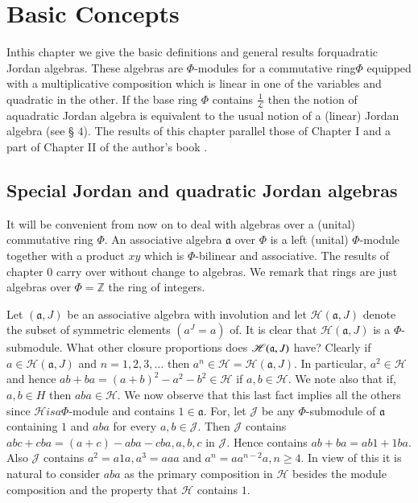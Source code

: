 \chapter{Basic Concepts}\label{c1}

In\pageoriginale this chapter we give the basic definitions and
general results for\break  quadratic Jordan algebras. These algebras are
$\Phi$-modules for a commutative ring$\Phi$ equipped with a
multiplicative composition which is linear in one of the variables and
quadratic in the other. If the base ring $\Phi$ contains
$\frac{1}{\mathscr{L}}$ then the notion of  aquadratic Jordan algebra
is equivalent to the usual notion of a (linear) Jordan algebra (see \S
$4$). The results of this chapter parallel those of Chapter I and a
part of Chapter II of the author's book \cite{JacobsonMcCrimmon1}. 

\section{Special Jordan and quadratic Jordan algebras}\label{c1:sec1}

It will be convenient from now on to deal with algebras over a
(unital) commutative ring $\Phi$. An associative algebra
$\mathfrak{a}$ over $\Phi$ is a left (unital) $\Phi$-module together
with a product $xy$ which is $\Phi$-bilinear and associative. The
results of chapter $0$ carry over without change to algebras. We
remark that rings are just algebras over $\Phi=\mathbb{Z}$ the ring of
integers. 

Let $(\mathfrak{a}, J)$ be an associative algebra with involution and
let $\mathscr{H}(\mathfrak{a}, J)$ denote the subset of symmetric
elements $(a^{J}=a)$ of. It is clear that
$\mathscr{H}(\mathfrak{a},J)$ is a $\Phi$-submodule. What other
closure proportions does $\mathscr{H}(\mathfrak{a},\break J)$ have? Clearly
if $a\in \mathscr{H}(\mathfrak{a}, J)$ and $n=1,2,3,\ldots$ then
$a^{n}\in \mathscr{H}=\mathscr{H}(\mathfrak{a},J)$. In particular,
$a^{2}\in \mathscr{H}$ and hence $ab+ba=(a+b)^{2}-a^{2}-b^{2}\in
\mathscr{H}$ if $a,b\in \mathscr{H}$. We note also that if, $a,b\in H$
then $aba\in \mathscr{H}$. We now observe that this last fact implies
all the others since $\mathscr{H} is a \Phi$-module and contains $1\in
\mathfrak{a}$. For, let $\mathscr{J}$ be any $\Phi$-submodule of
$\mathfrak{a}$ containing $1$ and $aba$ for every $a,b\in
\mathscr{J}$. Then $\mathscr{J}$ contains\pageoriginale
$abc+cba=(a+c)-aba-cba, a,b,c$ in $\mathscr{J}$. Hence contains
$ab+ba=ab1+1ba$. Also $\mathscr{J}$ contains $a^{2}=a1a, a^{3}=aaa$
and $a^{n}=aa^{n-2}a,n\ge 4$. In view of this it is natural to
consider $aba$ as the primary composition in $\mathscr{H}$ besides the
module composition and the property that $\mathscr{H}$ contains $1$. 

